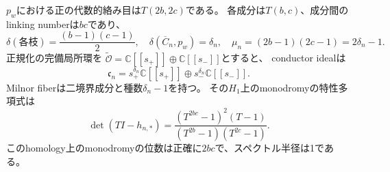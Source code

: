 \begin{theorem}[二成分トーラス絡み目と局所不変量]
\label{thm:boundary-torus-link}
$p_w$における正の代数的絡み目は$T(2b,2c)$である。
各成分は$T(b,c)$、成分間のlinking numberは$bc$であり、
\[
 \delta(\text{各枝})=\frac{(b-1)(c-1)}2,\quad
 \delta(\overline C_n,p_w)=\delta_n,\quad
 \mu_n=(2b-1)(2c-1)=2\delta_n-1.
\]
正規化の完備局所環を
$\widetilde{\mathcal O}=\mathbb C[[s_+]]\oplus\mathbb C[[s_-]]$とすると、
conductor idealは
\begin{equation}\label{eq:boundary-conductor}
 \mathfrak c_n=s_+^{\delta_n}\mathbb C[[s_+]]
               \oplus s_-^{\delta_n}\mathbb C[[s_-]].
\end{equation}
Milnor fiberは二境界成分と種数$\delta_n-1$を持つ。
その$H_1$上のmonodromyの特性多項式は
\begin{equation}\label{eq:Pell-link-monodromy}
 \det(TI-h_{n,*})
 =\frac{(T^{2bc}-1)^2(T-1)}{(T^{2b}-1)(T^{2c}-1)}.
\end{equation}
このhomology上のmonodromyの位数は正確に$2bc$で、スペクトル半径は1である。
\end{theorem}
